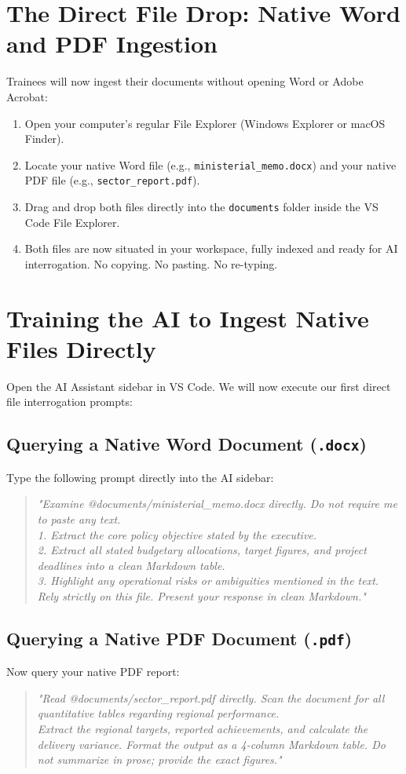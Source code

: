 \documentclass[11pt, a4paper]{report}
\begin{document}
\section{The Direct File Drop: Native Word and PDF Ingestion}
Trainees will now ingest their documents without opening Word or Adobe Acrobat:
\begin{enumerate}[label=\textbf{Step \arabic*:}]
    \item Open your computer's regular File Explorer (Windows Explorer or macOS Finder).
    \item Locate your native Word file (e.g., \texttt{ministerial\_memo.docx}) and your native PDF file (e.g., \texttt{sector\_report.pdf}).
    \item Drag and drop both files directly into the \texttt{documents} folder inside the VS Code File Explorer.
    \item Both files are now situated in your workspace, fully indexed and ready for AI interrogation. No copying. No pasting. No re-typing.
\end{enumerate}

\section{Training the AI to Ingest Native Files Directly}
Open the AI Assistant sidebar in VS Code. We will now execute our first direct file interrogation prompts:

\subsection{Querying a Native Word Document (\texttt{.docx})}
Type the following prompt directly into the AI sidebar:
\begin{quote}
\small
\textit{"Examine @documents/ministerial\_memo.docx directly. Do not require me to paste any text. \\
1. Extract the core policy objective stated by the executive. \\
2. Extract all stated budgetary allocations, target figures, and project deadlines into a clean Markdown table. \\
3. Highlight any operational risks or ambiguities mentioned in the text. \\
Rely strictly on this file. Present your response in clean Markdown."}
\end{quote}

\subsection{Querying a Native PDF Document (\texttt{.pdf})}
Now query your native PDF report:
\begin{quote}
\small
\textit{"Read @documents/sector\_report.pdf directly. Scan the document for all quantitative tables regarding regional performance. \\
Extract the regional targets, reported achievements, and calculate the delivery variance. Format the output as a 4-column Markdown table. Do not summarize in prose; provide the exact figures."}
\end{quote}
\end{document}
